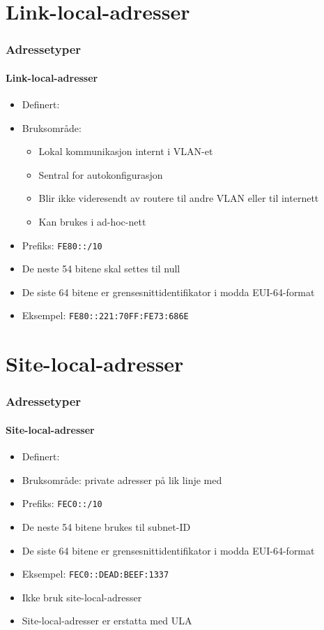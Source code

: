 \section{Link-local-adresser}
\begin{frame}%
  \frametitle{Adressetyper}
  \framesubtitle{Link-local-adresser}
  \pause
  \begin{itemize}[<+->]
  \item Definert: 
  \item Bruksområde:
    \begin{itemize}[<+->]
    \item Lokal kommunikasjon internt i VLAN-et
    \item Sentral for autokonfigurasjon
    \item Blir ikke videresendt av routere til andre VLAN eller til internett
    \item Kan brukes i ad-hoc-nett
    \end{itemize}
  \item Prefiks: \texttt{FE80::/10}
  \item De neste 54 bitene skal settes til null
  \item De siste 64 bitene er grensesnittidentifikator i modda
    EUI-64-format
  \item Eksempel: \texttt{FE80::221:70FF:FE73:686E}
  \end{itemize}
\end{frame}

\section{Site-local-adresser}
\begin{frame}%
  \frametitle{Adressetyper}
  \framesubtitle{Site-local-adresser}
  \pause
  \begin{itemize}[<+->]
  \item Definert: 
  \item Bruksområde: private adresser på lik linje med 
  \item Prefiks: \texttt{FEC0::/10}
  \item De neste 54 bitene brukes til subnet-ID
  \item De siste 64 bitene er grensesnittidentifikator i modda
    EUI-64-format
  \item Eksempel: \texttt{FEC0::DEAD:BEEF:1337}
  \item Ikke bruk site-local-adresser 
  \item Site-local-adresser er erstatta med ULA 
  \end{itemize}
\end{frame}

